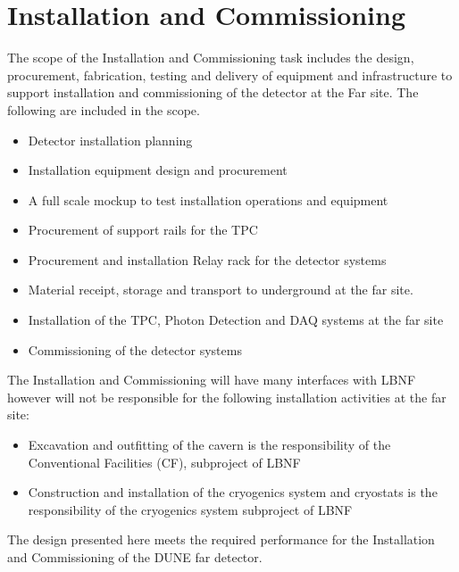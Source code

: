 \section{Installation and Commissioning}
\label{sec:detectors-fd-ref-install}

The scope of the Installation and Commissioning task includes the design, procurement, fabrication, testing and delivery of equipment and infrastructure to support installation and commissioning of the detector at the Far site. The following are included in the scope.
\begin{itemize}
\item Detector installation planning
\item Installation equipment design and procurement
\item A full scale mockup to test installation operations and equipment
\item Procurement of support rails for the TPC
\item Procurement and installation Relay rack for the detector systems
\item Material receipt, storage and transport to underground at the far site.
\item Installation of the TPC, Photon Detection and DAQ systems at the far site
\item Commissioning of the detector systems
\end{itemize}

The Installation and Commissioning will have many interfaces with LBNF however will not be responsible for the following installation activities at the far site:
\begin{itemize}
\item Excavation and outfitting of the cavern is the responsibility of the Conventional Facilities (CF), subproject of LBNF
\item Construction and installation of the cryogenics system and cryostats is the responsibility of the cryogenics system subproject of LBNF
\end{itemize}

The design presented here meets the required performance for the Installation and Commissioning of the DUNE far detector. 

